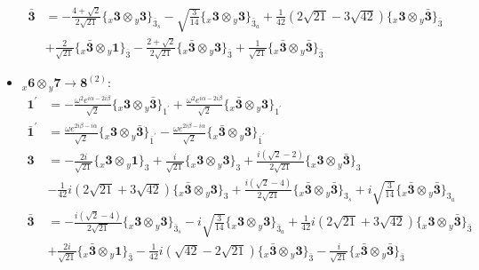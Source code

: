 \documentclass[english]{article}
\newcommand{\rep}[1]{\mathbf{#1}}
\newcommand{\repx}[2]{{}_{#2}\mathbf{#1}}
\newcommand{\subcg}[3]{\big\{ \repx{#1}{x}\otimes\repx{#2}{y}\big\}^{}_{#3}}
\begin{document}
\begin{itemize}
\begin{align*}
\\
\rep{\bar{3}} & = -\frac{4+\sqrt{2}}{2 \sqrt{21}}\subcg{3}{3}{\bar{3}_{s}}-\sqrt{\frac{3}{14}}\subcg{3}{3}{\bar{3}_{a}}+\frac{1}{42} \left(2 \sqrt{21}-3 \sqrt{42}\right)\subcg{3}{\bar{3}}{\bar{3}} \\ 
 & +\frac{2}{\sqrt{21}}\subcg{\bar{3}}{1}{\bar{3}}-\frac{2+\sqrt{2}}{2 \sqrt{21}}\subcg{\bar{3}}{3}{\bar{3}}+\frac{1}{\sqrt{21}}\subcg{\bar{3}}{\bar{3}}{\bar{3}}
\end{align*}
\item $\repx{6}{x}\otimes\repx{7}{y}\to\rep{8}^{(2)}$:
\begin{align*}
\rep{1^{\prime}} & = -\frac{\omega ^2 e^{i \alpha -2 i \beta }}{\sqrt{2}}\subcg{3}{\bar{3}}{1^{\prime}}+\frac{\omega ^2 e^{i \alpha -2 i \beta }}{\sqrt{2}}\subcg{\bar{3}}{3}{1^{\prime}}
\\
\rep{\bar{1}^{\prime}} & = \frac{\omega  e^{2 i \beta -i \alpha }}{\sqrt{2}}\subcg{3}{\bar{3}}{\bar{1}^{\prime}}-\frac{\omega  e^{2 i \beta -i \alpha }}{\sqrt{2}}\subcg{\bar{3}}{3}{\bar{1}^{\prime}}
\\
\rep{3} & = -\frac{2 i}{\sqrt{21}}\subcg{3}{1}{3}+\frac{i}{\sqrt{21}}\subcg{3}{3}{3}+\frac{i \left(\sqrt{2}-2\right)}{2 \sqrt{21}}\subcg{3}{\bar{3}}{3} \\ 
 & -\frac{1}{42} i \left(2 \sqrt{21}+3 \sqrt{42}\right)\subcg{\bar{3}}{3}{3}+\frac{i \left(\sqrt{2}-4\right)}{2 \sqrt{21}}\subcg{\bar{3}}{\bar{3}}{3_{s}}+i \sqrt{\frac{3}{14}}\subcg{\bar{3}}{\bar{3}}{3_{a}}
\\
\rep{\bar{3}} & = -\frac{i \left(\sqrt{2}-4\right)}{2 \sqrt{21}}\subcg{3}{3}{\bar{3}_{s}}-i \sqrt{\frac{3}{14}}\subcg{3}{3}{\bar{3}_{a}}+\frac{1}{42} i \left(2 \sqrt{21}+3 \sqrt{42}\right)\subcg{3}{\bar{3}}{\bar{3}} \\ 
 & +\frac{2 i}{\sqrt{21}}\subcg{\bar{3}}{1}{\bar{3}}-\frac{1}{42} i \left(\sqrt{42}-2 \sqrt{21}\right)\subcg{\bar{3}}{3}{\bar{3}}-\frac{i}{\sqrt{21}}\subcg{\bar{3}}{\bar{3}}{\bar{3}}
\end{align*}
\end{itemize}
\end{document}
